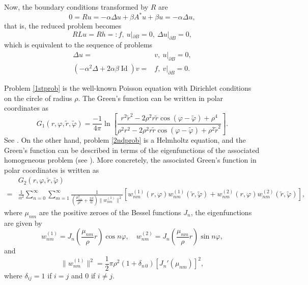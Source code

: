 \documentclass[a4paper,12pt,onecolumn]{article}
\theoremstyle{ptheorem}
\theoremstyle{hdef}
\theoremstyle{premark}
\numberwithin{equation}{section}
\numberwithin{figure}{section}
\DeclareMathOperator{\Id}{Id}
\renewcommand{\a}{\alpha}
\renewcommand{\b}{\beta}
\newcommand{\<}{\langle}
\renewcommand{\>}{\rangle}
\renewcommand{\<}{\left<}
\renewcommand{\>}{\right>}
\renewcommand{\(}{\left(}
\renewcommand{\)}{\right)}
\begin{document}
Now, the boundary conditions transformed by $R$ are
\[0=Ru=-\a\Delta u+\b A^*u+\b u=-\a\Delta u, \]
that is, the reduced problem becomes
\begin{equation}\label{redeq}
RLu=Rh=:f,\ u|_{\partial B}=0,\ \Delta u|_{\partial B}=0,
\end{equation}
which is equivalent to the sequence of problems
\begin{align}
\Delta u= & v,\ u|_{\partial B}=0,\label{1stprob}\\
(-\a^2\Delta+2\a\b\Id)v= & f, \ v|_{\partial B}=0.\label{2ndprob}
\end{align}

Problem \eqref{1stprob} is the well-known Poisson equation with Dirichlet conditions on the circle of radius $\rho$. The Green's function can be written in polar coordinates as
\begin{displaymath}
G_1(r,\varphi,\tilde r,\tilde \varphi)=\frac{-1}{4\pi}\ln\left[\frac{r^2\tilde r^2 -2\rho^2 r\tilde r\cos(\varphi-\tilde\varphi)+\rho^4}{ \rho^2r^2-2 \rho^2 r\tilde r\cos(\varphi-\tilde\varphi)+ \rho^2\tilde r^2}\right].
\end{displaymath}
See \cite[Section 7.2.3]{Poly}. On the other hand, problem \eqref{2ndprob} is a Helmholtz equation, and the Green's function can be described in terms of the eigenfunctions of the associated homogeneous problem (see \cite[Section 7.3.3]{Poly}). More concretely, the associated Green's function in polar coordinates is written as
\begin{align*}
& G_2(r,\varphi,\tilde r,\tilde \varphi) \\ = & \frac{1}{\alpha^2}\sum_{n=0}^{\infty}\sum_{m=1}^{\infty}\frac{1}{\left(\frac{\mu_{nm}^2}{\rho^2}+\frac{2\beta}{\alpha}\right)\|w_{nm}^{(1)}\|^2}
\left[w_{nm}^{(1)}(r,\varphi)w_{nm}^{(1)}(\tilde r,\tilde \varphi)+w_{nm}^{(2)}(r,\varphi)w_{nm}^{(2)}(\tilde r,\tilde \varphi) \right],
\end{align*}
where $\mu_{nm}$ are the positive zeroes of the Bessel functions $J_n$, the eigenfunctions are given by
\begin{displaymath}
w_{nm}^{(1)}=J_n\left(\frac{\mu_{nm}}{\rho}r\right)\cos n\varphi,\quad w_{nm}^{(2)}=J_n\left(\frac{\mu_{nm}}{\rho}r\right)\sin n\varphi,
\end{displaymath}
and 
\begin{displaymath}
\|w_{nm}^{(1)}\|^2=\frac{1}{2}\pi \rho^2 (1+\delta_{n\,0})\left[J_{n}'(\mu_{nm})\right]^2,
\end{displaymath}
where $\delta_{ij}=1$ if $i=j$ and $0$ if $i\ne j$.
\end{document}
